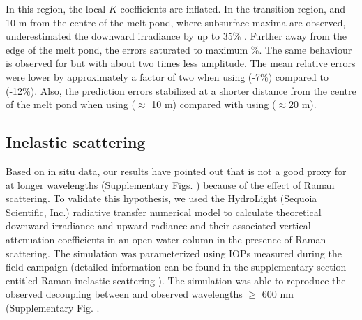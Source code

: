 In this region, the local $K$ coefficients are inflated. In the transition region, \DIFdelbegin {}\DIFdelend \DIFaddbegin {} and 10 m from the centre of the melt pond, where subsurface maxima are observed, \ked{} underestimated the downward irradiance by up to 35\% \DIFdelbegin {}\DIFdelend \DIFaddbegin {}\DIFdelbegin {}\DIFdelend \DIFaddbegin {}\DIFaddend . Further away from the edge of the melt pond, the errors saturated to maximum \DIFaddbegin {}\%. The same behaviour is observed for \klu{} but with about two times less amplitude. The mean relative errors were lower by approximately a factor of two when using \klu{} (-7\%) compared to \ked{} (-12\%). Also, the prediction errors stabilized at a shorter \DIFaddbegin {}\DIFaddend distance from the centre of the melt pond when using \klu{} ($\approx$ 10 m) compared with using \ked{} ($\approx$20 m). 

\subsection{Inelastic scattering}

Based on in situ data, our results have pointed out that \klu{} is not a good proxy for \ked{} at longer wavelengths (Supplementary Figs. \DIFdelbegin {}\DIFdelend \DIFaddbegin {}\DIFaddend ) because of the effect of Raman scattering. To validate this hypothesis, we used the HydroLight (Sequoia Scientific, Inc.) radiative transfer numerical model to calculate theoretical downward irradiance and upward radiance and their associated vertical attenuation coefficients in an open water column in the presence of Raman scattering. The simulation was parameterized using IOPs measured during the field campaign (detailed information can be found in the supplementary section entitled Raman inelastic scattering \DIFaddbegin {}\DIFaddend ). The simulation was able to reproduce the observed decoupling between \ked{} and \klu{} observed \DIFdelbegin {}\DIFdelend \DIFaddbegin {}\DIFaddend wavelengths $\ge$ 600 nm (Supplementary Fig. \DIFdelbegin {}\DIFdelend \DIFaddbegin {}\DIFaddend .
